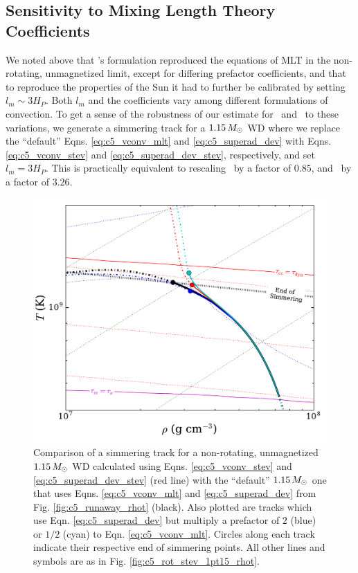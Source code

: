 \subsection{Sensitivity to Mixing Length Theory Coefficients}
\label{ssec:c5_sensitive_apdx}

We noted above that \citeal{stev79}'s formulation reproduced the equations of MLT in the non-rotating, unmagnetized limit, except for differing prefactor coefficients, and that to reproduce the properties of the Sun it had to further be calibrated by setting $l_m \sim 3H_P$.  Both $l_m$ and the coefficients vary among different formulations of convection.  To get a sense of the robustness of our estimate for \Mcrit\ and \MNi\ to these variations, we generate a simmering track for a $1.15\,\Msun$ WD where we replace the ``default'' Eqns. \ref{eq:c5_vconv_mlt} and \ref{eq:c5_superad_dev} with Eqns. \ref{eq:c5_vconv_stev} and \ref{eq:c5_superad_dev_stev}, respectively, and set $l_m = 3H_P$.  This is practically equivalent to rescaling \vconv\ by a factor of $0.85$, and \dnabconv\ by a factor of $3.26$.




\begin{figure}
\centering
\includegraphics[angle=0,width=0.8\columnwidth]{chapter5_zhu+16/figures/diag_1pt15_rhot.pdf}
\caption{Comparison of a simmering track for a non-rotating, unmagnetized $1.15\,\Msun$ WD calculated using Eqns. \ref{eq:c5_vconv_stev} and \ref{eq:c5_superad_dev_stev} (red line) with the ``default'' $1.15\,\Msun$ one that uses Eqns. \ref{eq:c5_vconv_mlt} and \ref{eq:c5_superad_dev} from Fig. \ref{fig:c5_runaway_rhot} (black).  Also plotted are tracks which use Eqn. \ref{eq:c5_superad_dev} but multiply a prefactor of $2$ (blue) or $1/2$ (cyan) to Eqn. \ref{eq:c5_vconv_mlt}.  Circles along each track indicate their respective end of simmering points.  All other lines and symbols are as in Fig. \ref{fig:c5_rot_stev_1pt15_rhot}.}
\label{fig:c5_mltcoeff_rhot}
\end{figure}

